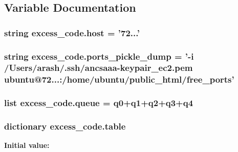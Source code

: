 \subsection{Variable Documentation}
\hypertarget{namespaceexcess__code_a7b2d2af5fa2f9fb9bf672bd07044add1}{
\subsubsection[{host}]{\setlength{\rightskip}{0pt plus 5cm}string excess\-\_\-code.\-host = '72...'}}\label{namespaceexcess__code_a7b2d2af5fa2f9fb9bf672bd07044add1}
\hypertarget{namespaceexcess__code_ad482d3963c307055389db29a0d9b9725}{
\subsubsection[{ports\-\_\-pickle\-\_\-dump}]{\setlength{\rightskip}{0pt plus 5cm}string excess\-\_\-code.\-ports\-\_\-pickle\-\_\-dump = '-\/i /Users/arash/.ssh/ancsaaa-\/keypair\-\_\-ec2.\-pem ubuntu@72...\-:/home/ubuntu/public\-\_\-html/free\-\_\-ports'}}\label{namespaceexcess__code_ad482d3963c307055389db29a0d9b9725}
\hypertarget{namespaceexcess__code_ad9642f3ca12ca84caed8a65645ba6688}{
\subsubsection[{queue}]{\setlength{\rightskip}{0pt plus 5cm}list excess\-\_\-code.\-queue = q0+q1+q2+q3+q4}}\label{namespaceexcess__code_ad9642f3ca12ca84caed8a65645ba6688}
\hypertarget{namespaceexcess__code_ac888a34cdc4f20d89623cfe2f3b2727d}{
\subsubsection[{table}]{\setlength{\rightskip}{0pt plus 5cm}dictionary excess\-\_\-code.\-table}}\label{namespaceexcess__code_ac888a34cdc4f20d89623cfe2f3b2727d}
{\bfseries Initial value\-:}
